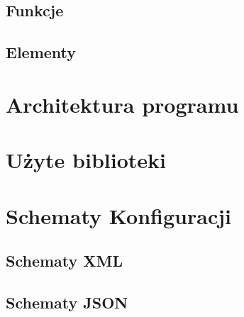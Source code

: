 \documentclass{iiuwb}
\begin{document}
\subsection{Funkcje}

\subsection{Elementy}

\section{Architektura programu}

\section{Użyte biblioteki}

\section{Schematy Konfiguracji}

\subsection{Schematy XML}

\subsection{Schematy JSON}

\cleardoublepage


\end{document}
